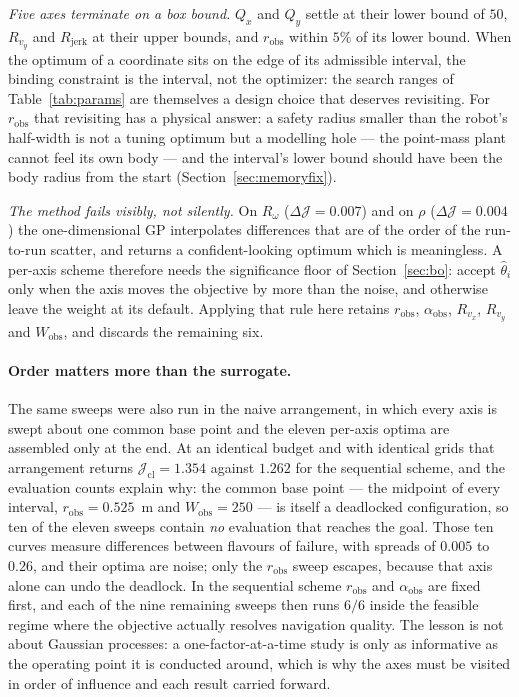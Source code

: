 \documentclass[11pt,a4paper]{article}
\newcommand{\Wobs}{W_{\mathrm{obs}}}
\newcommand{\aobs}{\alpha_{\mathrm{obs}}}
\newcommand{\robs}{r_{\mathrm{obs}}}
\newcommand{\Rjerk}{R_{\mathrm{jerk}}}
\begin{document}
\emph{Five axes terminate on a box bound.} $Q_x$ and $Q_y$ settle at their lower bound of $50$, $R_{v_y}$ and
$\Rjerk$ at their upper bounds, and $\robs$ within $5\%$ of its lower bound. When the optimum of a coordinate
sits on the edge of its admissible interval, the binding constraint is the interval, not the optimizer: the
search ranges of Table~\ref{tab:params} are themselves a design choice that deserves revisiting. For
$\robs$ that revisiting has a physical answer: a safety radius smaller than the robot's half-width is not a
tuning optimum but a modelling hole --- the point-mass plant cannot feel its own body --- and the interval's
lower bound should have been the body radius from the start (Section~\ref{sec:memoryfix}).

\emph{The method fails visibly, not silently.} On $R_\omega$ ($\Delta\mathcal{J}=0.007$) and on $\rho$
($\Delta\mathcal{J}=0.004$) the one-dimensional GP interpolates differences that are of the order of the
run-to-run scatter, and returns a confident-looking optimum which is meaningless. A per-axis scheme therefore
needs the significance floor of Section~\ref{sec:bo}: accept $\hat\theta_i$ only when the axis moves the
objective by more than the noise, and otherwise leave the weight at its default. Applying that rule here
retains $\robs$, $\aobs$, $R_{v_x}$, $R_{v_y}$ and $\Wobs$, and discards the remaining six.

\paragraph{Order matters more than the surrogate.} The same sweeps were also run in the naive arrangement, in
which every axis is swept about one common base point and the eleven per-axis optima are assembled only at the
end. At an identical budget and with identical grids that arrangement returns
$\mathcal{J}_{\mathrm{cl}}=1.354$ against $1.262$ for the sequential scheme, and the evaluation counts explain
why: the common base point --- the midpoint of every interval, $\robs=0.525$~m and $\Wobs=250$ --- is itself a
deadlocked configuration, so ten of the eleven sweeps contain \emph{no} evaluation that reaches the goal.
Those ten curves measure differences between flavours of failure, with spreads of $0.005$ to $0.26$, and their
optima are noise; only the $\robs$ sweep escapes, because that axis alone can undo the deadlock. In the
sequential scheme $\robs$ and $\aobs$ are fixed first, and each of the nine remaining sweeps then runs $6/6$
inside the feasible regime where the objective actually resolves navigation quality. The lesson is not about
Gaussian processes: a one-factor-at-a-time study is only as informative as the operating point it is conducted
around, which is why the axes must be visited in order of influence and each result carried forward.
\end{document}
